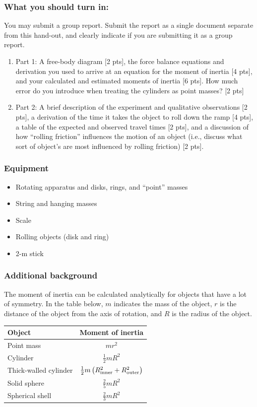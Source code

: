 \documentclass[11pt,letterpaper]{article}
\begin{document}
\subsubsection*{What you should turn in:} 
You may submit a group report. Submit the report as a single document separate from this hand-out, and clearly indicate if you are submitting it as a group report.
\begin{enumerate}
\setlength{\parskip}{3pt}
\item Part 1: A free-body diagram [2 pts], the force balance equations and derivation you used to arrive at an equation for the moment of inertia [4 pts], and your calculated and estimated moments of inertia [6 pts]. How much error do you introduce when treating the cylinders as point masses? [2 pts]
\item Part 2: A brief description of the experiment and qualitative observations [2 pts], a derivation of the time it takes the object to roll down the ramp [4 pts], a table of the expected and observed travel times [2 pts], and a discussion of how ``rolling friction'' influences the motion of an object (i.e., discuss what sort of object's are most influenced by rolling friction) [2 pts].
\end{enumerate}

\subsubsection*{Equipment}
\begin{itemize}
\setlength{\parskip}{3pt}
\item Rotating apparatus and disks, rings, and ``point'' masses
\item String and hanging masses
\item Scale
\item Rolling objects (disk and ring)
\item 2-m stick
\end{itemize}

\pagebreak
\subsubsection*{Additional background}
The moment of inertia can be calculated analytically for objects that have a lot of symmetry. In the table below, $m$ indicates the mass of the object, $r$ is the distance of the object from the axis of rotation, and $R$ is the radius of the object.

\renewcommand{\arraystretch}{2}
\begin{table}[h]
\begin{tabular}{|l|c|}
\hline
Object & Moment of inertia\\
\hline
Point mass & $mr^2$\\
Cylinder & $\frac{1}{2}mR^2$\\
Thick-walled cylinder & $\frac{1}{2}m\left(R_{\rm inner}^2+R_{\rm outer}^2\right)$\\
Solid sphere & $\frac{2}{5}mR^2$\\
Spherical shell & $\frac{2}{3}mR^2$\\
\hline
\end{tabular}
\end{table}
\end{document}
